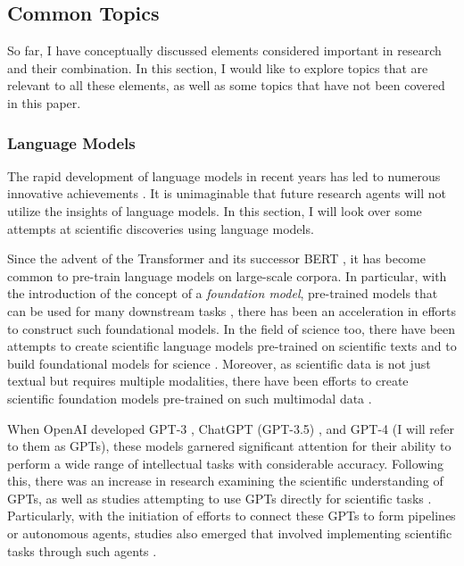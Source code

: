 \subsection{Common Topics}
So far, I have conceptually discussed elements considered important in research and their combination. In this section, I would like to explore topics that are relevant to all these elements, as well as some topics that have not been covered in this paper.


\subsubsection{Language Models}
The rapid development of language models in recent years has led to numerous innovative achievements \cite{zhao2023survey}. It is unimaginable that future research agents will not utilize the insights of language models. In this section, I will look over some attempts at scientific discoveries using language models.

Since the advent of the Transformer \cite{vaswani2017attention} and its successor BERT \cite{devlin2018bert}, it has become common to pre-train language models on large-scale corpora. In particular, with the introduction of the concept of a \textit{foundation model}, pre-trained models that can be used for many downstream tasks \cite{bommasani2021opportunities}, there has been an acceleration in efforts to construct such foundational models. In the field of science too, there have been attempts to create scientific language models pre-trained on scientific texts and to build foundational models for science \cite{beltagy2019scibert,singh2022scirepeval,nadkarni2021scientific,cohan2020specter,gupta2022matscibert,taylor2022galactica,azerbayev2023llemma,xie2023darwin,luo2022biogpt,li2023llava}. Moreover, as scientific data is not just textual but requires multiple modalities, there have been efforts to create scientific foundation models pre-trained on such multimodal data \cite{singhal2023towards,takeda2023foundation,nguyen2023climax}.

When OpenAI developed GPT-3 \cite{brown2020language}, ChatGPT (GPT-3.5) \cite{ChatGPT}, and GPT-4 \cite{GPT4} (I will refer to them as GPTs), these models garnered significant attention for their ability to perform a wide range of intellectual tasks with considerable accuracy. Following this, there was an increase in research examining the scientific understanding of GPTs, as well as studies attempting to use GPTs directly for scientific tasks \cite{bordt2023chatgpt,white2022large}. Particularly, with the initiation of efforts to connect these GPTs to form pipelines or autonomous agents, studies also emerged that involved implementing scientific tasks through such agents \cite{wang2023survey}.

